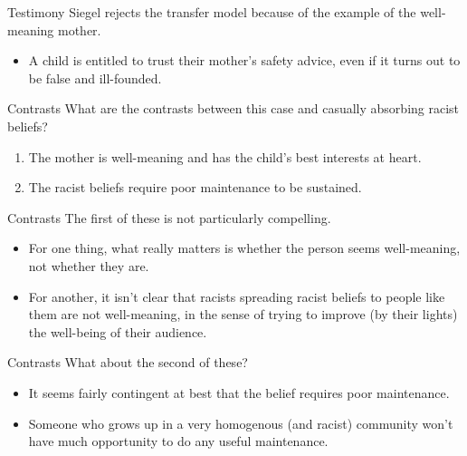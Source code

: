 \documentclass[
  17pt,
  letterpaper,
  ignorenonframetext,
  aspectratio=169,
  xcolor={dvipsnames}]{beamer}
\providecommand{\tightlist}{%
  \setlength{\itemsep}{0pt}\setlength{\parskip}{0pt}}\usepackage{longtable,booktabs,array}
\begin{document}
\begin{frame}{Testimony}
\protect\hypertarget{testimony-2}{}
Siegel rejects the transfer model because of the example of the
well-meaning mother.

\begin{itemize}[<+->]
\tightlist
\item
  A child is entitled to trust their mother's safety advice, even if it
  turns out to be false and ill-founded.
\end{itemize}
\end{frame}

\begin{frame}{Contrasts}
\protect\hypertarget{contrasts}{}
What are the contrasts between this case and casually absorbing racist
beliefs?

\begin{enumerate}[<+->]
\tightlist
\item
  The mother is well-meaning and has the child's best interests at
  heart.
\item
  The racist beliefs require poor maintenance to be sustained.
\end{enumerate}
\end{frame}

\begin{frame}{Contrasts}
\protect\hypertarget{contrasts-1}{}
The first of these is not particularly compelling.

\begin{itemize}[<+->]
\tightlist
\item
  For one thing, what really matters is whether the person seems
  well-meaning, not whether they are.
\item
  For another, it isn't clear that racists spreading racist beliefs to
  people like them are not well-meaning, in the sense of trying to
  improve (by their lights) the well-being of their audience.
\end{itemize}
\end{frame}

\begin{frame}{Contrasts}
\protect\hypertarget{contrasts-2}{}
What about the second of these?

\begin{itemize}[<+->]
\tightlist
\item
  It seems fairly contingent at best that the belief requires poor
  maintenance.
\item
  Someone who grows up in a very homogenous (and racist) community won't
  have much opportunity to do any useful maintenance.
\end{itemize}
\end{frame}
\end{document}
